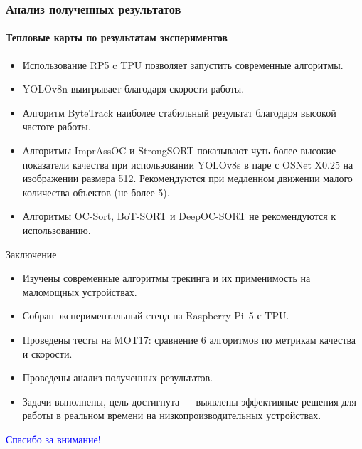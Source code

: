\documentclass{beamer} %
\begin{document}
\begin{frame}
  \frametitle{Анализ полученных результатов}
  \framesubtitle{Тепловые карты по результатам экспериментов}
  \begin{itemize}
    \item Использование RP5 c TPU позволяет запустить современные алгоритмы.
    \item YOLOv8n выигрывает благодаря скорости работы.
    \item Алгоритм ByteTrack наиболее стабильный результат благодаря высокой частоте работы.
    \item Алгоритмы ImprAssOC и StrongSORT показывают чуть более высокие показатели качества при использовании YOLOv8s в паре с OSNet X0.25 на изображении размера 512. Рекомендуются при медленном движении малого количества объектов (не более 5).
    \item Алгоритмы OC-Sort, BoT-SORT и DeepOC-SORT не рекомендуются к использованию.
  \end{itemize}
\end{frame}

\begin{frame}{Заключение}
  \begin{itemize}
    \item Изучены современные алгоритмы трекинга и их применимость на маломощных устройствах.
    \item Собран экспериментальный стенд на Raspberry Pi 5 с TPU.
    \item Проведены тесты на MOT17: сравнение 6 алгоритмов по метрикам качества и скорости.
    \item Проведены анализ полученных результатов.
    \item Задачи выполнены, цель достигнута — выявлены эффективные решения для работы в реальном времени на низкопроизводительных устройствах.
  \end{itemize}
\end{frame}


\begin{frame}
  \centering \Huge \textcolor{blue}{Спасибо за внимание!}
\end{frame}
\end{document}
